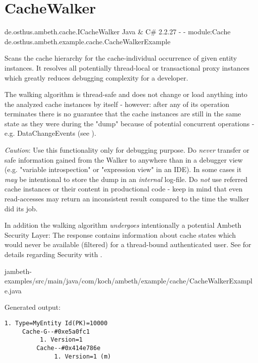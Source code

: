 \section{CacheWalker}
\label{feature:CacheWalker}
\ClearAPI
\feature
	{de.osthus.ambeth.cache.ICacheWalker}
	{Java \& C\#}
	{2.2.27}
	{-}
	{-}
	{module:Cache}
	{de.osthus.ambeth.example.cache.CacheWalkerExample}

Scans the cache hierarchy for the cache-individual occurrence of given entity instances. It resolves all potentially thread-local or transactional proxy instances which greatly reduces debugging complexity for a developer.\newline

The walking algorithm is thread-safe and does not change or load anything into the analyzed cache instances by itself - however: after any of its operation terminates there is no guarantee that the cache instances are still in the same state as they were during the "dump" because of potential concurrent operations - e.g. DataChangeEvents (see ).\newline

\emph{Caution}: Use this functionality only for debugging purpose. Do \emph{never} transfer or safe information gained from the Walker to anywhere than in a debugger view (e.g. "variable introspection" or "expression view" in an IDE). In some cases it \emph{may} be intentional to store the dump in an \emph{internal} log-file. Do \emph{not} use referred cache instances or their content in productional code - keep in mind that even read-accesses may return an inconsistent result compared to the time the walker did its job.\newline

In addition the walking algorithm \emph{undergoes} intentionally a potential Ambeth Security Layer: The response contains information about cache states which would never be available (filtered) for a thread-bound authenticated user. See  for details regarding Security with .

	{jambeth-examples/src/main/java/com/koch/ambeth/example/cache/CacheWalkerExample.java}

Generated output:

\begin{lstlisting}[style=Console]
	1. Type=MyEntity Id(PK)=10000
	 Cache-G--#0xe5a0fc1
		  1. Version=1
		 Cache--#0x414e786e
			  1. Version=1 (m)
\end{lstlisting}

